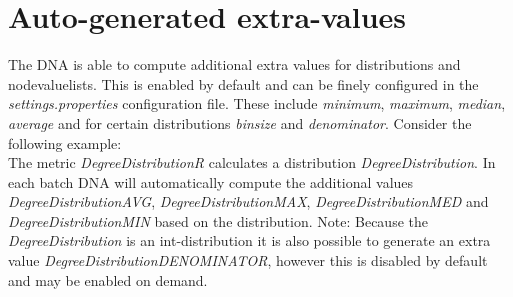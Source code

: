 \section{Auto-generated extra-values}
The DNA is able to compute additional extra values for distributions and nodevaluelists. This is enabled by default and can be finely configured in the \textit{settings.properties} configuration file. These include \textit{minimum}, \textit{maximum}, \textit{median}, \textit{average} and for certain distributions \textit{binsize} and \textit{denominator}. Consider the following example:\\

The metric \textit{DegreeDistributionR} calculates a distribution \textit{DegreeDistribution}. In each batch DNA will automatically compute the additional values \textit{DegreeDistribution\textunderscore AVG}, \textit{DegreeDistribution\textunderscore MAX}, \textit{DegreeDistribution\textunderscore MED} and \textit{DegreeDistribution\textunderscore MIN} based on the distribution. Note: Because the \textit{DegreeDistribution} is an int-distribution it is also possible to generate an extra value \textit{DegreeDistribution\textunderscore DENOMINATOR}, however this is disabled by default and may be enabled on demand.